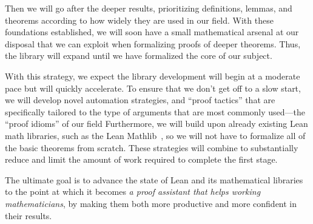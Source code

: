 \documentclass[12pt]{amsart}  %
\begin{document}
Then we will go after the deeper results, prioritizing definitions, lemmas, and theorems
according to how widely they are used in our field.
With these foundations established, we will soon have a small mathematical arsenal 
at our disposal that we can exploit when formalizing proofs of deeper theorems.
Thus, the library will expand until we have formalized the core of our subject.

With this strategy, we expect the library development will begin at a moderate pace
but will quickly accelerate.  To ensure that we don't get off to a slow start,
we will develop novel automation strategies, and ``proof tactics'' that are specifically
tailored to the type of arguments that are most commonly used---the ``proof idioms'' of our field
Furthermore, we will build upon already existing Lean math libraries, such as the Lean 
Mathlib~\cite{lean-mathlib:2018}, so we will not have to formalize all of the basic 
theorems from scratch. These strategies will combine to substantially reduce and limit the amount of work required
to complete the first stage.

The ultimate goal is to advance the state of Lean and its mathematical libraries
to the point at which it becomes
\emph{a proof assistant that helps working mathematicians}, by making them both
more productive and more confident in their results.




\end{document}
